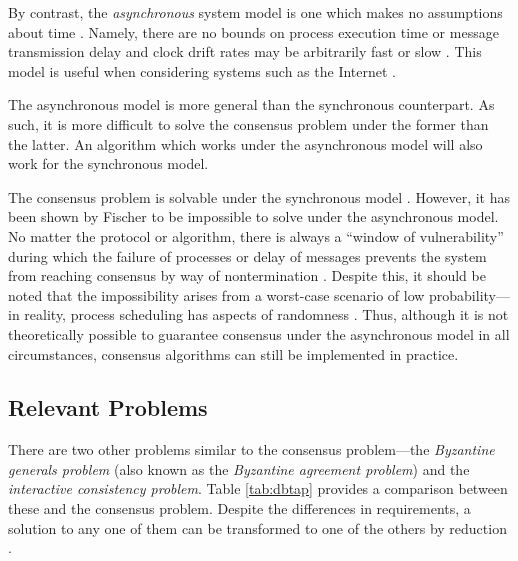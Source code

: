 \documentclass[12pt, a4paper]{article}
\begin{document}
By contrast, the \textit{asynchronous} system model is one which makes no
assumptions about time \cite{coulouris2005distributed, hadzilacos1994modular}.
Namely, there are no bounds on process execution time or message transmission
delay and clock drift rates may be arbitrarily fast or slow
\cite{coulouris2005distributed}. This model is useful when considering systems
such as the Internet \cite{coulouris2005distributed}.

The asynchronous model is more general than the synchronous counterpart. As
such, it is more difficult to solve the consensus problem under the former than
the latter. An algorithm which works under the asynchronous model will also work
for the synchronous model.

The consensus problem is solvable under the synchronous model
\cite{fischer1985impossibility, kshemkalyani_singhal_2008}. However, it has been
shown by Fischer \cite{fischer1985impossibility} to be impossible to solve under
the asynchronous model. No matter the protocol or algorithm, there is always a
``window of vulnerability'' during which the failure of processes or delay of
messages prevents the system from reaching consensus by way of nontermination
\cite{fischer1985impossibility}. Despite this, it should be noted that the
impossibility arises from a worst-case scenario of low probability---in reality,
process scheduling has aspects of randomness \cite{aguilera2010stumbling}. Thus,
although it is not theoretically possible to guarantee consensus under the
asynchronous model in all circumstances, consensus algorithms can still be
implemented in practice.


\subsection{Relevant Problems} \label{sec:relevant-problems}

There are two other problems similar to the consensus problem---the
\textit{Byzantine generals problem} (also known as the \textit{Byzantine
agreement problem}) and the \textit{interactive consistency problem}. Table
\ref{tab:dbtap} provides a comparison between these and the consensus problem.
Despite the differences in requirements, a solution to any one of them can be
transformed to one of the others by reduction \cite{fischer1983consensus}.
\end{document}
